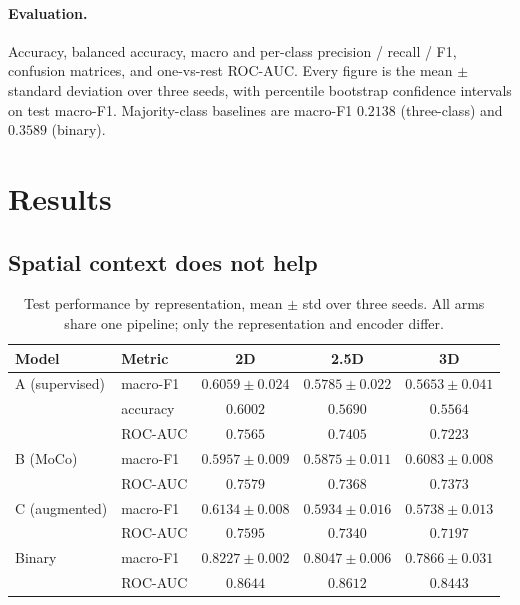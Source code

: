 \documentclass[11pt]{article}
\begin{document}
\paragraph{Evaluation.} Accuracy, balanced accuracy, macro and per-class
precision / recall / F1, confusion matrices, and one-vs-rest ROC-AUC. Every
figure is the mean $\pm$ standard deviation over three seeds, with percentile
bootstrap confidence intervals on test macro-F1. Majority-class baselines are
macro-F1 $0.2138$ (three-class) and $0.3589$ (binary).

\section{Results}

\subsection{Spatial context does not help}

\begin{table}[t]\centering
\caption{Test performance by representation, mean $\pm$ std over three seeds.
All arms share one pipeline; only the representation and encoder differ.}
\label{tab:main}
\begin{tabular}{llccc}
\toprule
Model & Metric & 2D & 2.5D & 3D \\
\midrule
A (supervised) & macro-F1 & $0.6059 \pm 0.024$ & $0.5785 \pm 0.022$ & $0.5653 \pm 0.041$ \\
               & accuracy & $0.6002$ & $0.5690$ & $0.5564$ \\
               & ROC-AUC  & $0.7565$ & $0.7405$ & $0.7223$ \\
\midrule
B (MoCo)       & macro-F1 & $0.5957 \pm 0.009$ & $0.5875 \pm 0.011$ & $0.6083 \pm 0.008$ \\
               & ROC-AUC  & $0.7579$ & $0.7368$ & $0.7373$ \\
\midrule
C (augmented)  & macro-F1 & $0.6134 \pm 0.008$ & $0.5934 \pm 0.016$ & $0.5738 \pm 0.013$ \\
               & ROC-AUC  & $0.7595$ & $0.7340$ & $0.7197$ \\
\midrule
Binary         & macro-F1 & $0.8227 \pm 0.002$ & $0.8047 \pm 0.006$ & $0.7866 \pm 0.031$ \\
               & ROC-AUC  & $0.8644$ & $0.8612$ & $0.8443$ \\
\bottomrule
\end{tabular}
\end{table}
\end{document}
